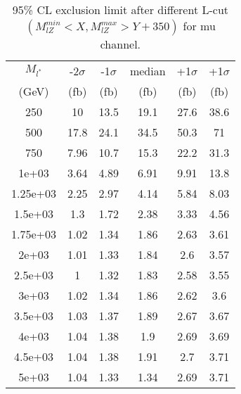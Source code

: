 \documentclass[]{article}
\begin{document}
\begin{table}
\begin{center}
\begin{tabular}{cccccc}
\hline 
\hline 
$M_{l^*}$ & -2$\sigma$ & -1$\sigma$ & median & +1$\sigma$ & +1$\sigma$\\ 
(GeV) & (fb) & (fb) & (fb) & (fb) & (fb)  \\ 
\hline 
\hline 
250 & 10 & 13.5 & 19.1 & 27.6 & 38.6\\
500 & 17.8 & 24.1 & 34.5 & 50.3 & 71\\
750 & 7.96 & 10.7 & 15.3 & 22.2 & 31.3\\
1e+03 & 3.64 & 4.89 & 6.91 & 9.91 & 13.8\\
1.25e+03 & 2.25 & 2.97 & 4.14 & 5.84 & 8.03\\
1.5e+03 & 1.3 & 1.72 & 2.38 & 3.33 & 4.56\\
1.75e+03 & 1.02 & 1.34 & 1.86 & 2.63 & 3.61\\
2e+03 & 1.01 & 1.33 & 1.84 & 2.6 & 3.57\\
2.5e+03 & 1 & 1.32 & 1.83 & 2.58 & 3.55\\
3e+03 & 1.02 & 1.34 & 1.86 & 2.62 & 3.6\\
3.5e+03 & 1.03 & 1.37 & 1.89 & 2.67 & 3.67\\
4e+03 & 1.04 & 1.38 & 1.9 & 2.69 & 3.69\\
4.5e+03 & 1.04 & 1.38 & 1.91 & 2.7 & 3.71\\
5e+03 & 1.04 & 1.33 & 1.34 & 2.69 & 3.71\\
\hline 
\end{tabular}
\caption{95\% CL exclusion limit after different L-cut $(M_{lZ}^{min} < X, M_{lZ}^{max} > Y + 350)$ for mu channel.}
\label{tab:limit_muon}
\end{center}
\end{table}
\end{document}
